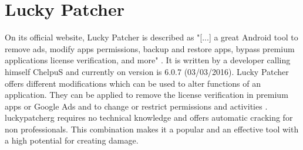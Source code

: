 \section{Lucky Patcher} \label{section:luckypatcher-explain}
On its official website, Lucky Patcher is described as "[...] a great Android tool to remove ads, modify apps permissions, backup and restore apps, bypass premium applications license verification, and more" \cite{luckyPatcherOfficial}.
It is written by a developer calling himself ChelpuS and currently on version is 6.0.7 (03/03/2016).
\newline
Lucky Patcher offers different modifications which can be used to alter functions of an application.
They can be applied to remove the license verification in premium apps or Google Ads and to change or restrict permissions and activities \cite{luckyPatcherOfficial}.
\newline
\gls{luckypatcherg} requires no technical knowledge and offers automatic cracking for non professionals.
This combination makes it a popular and an effective tool with a high potential for creating damage. \cite{munteanLicense}
\newline
